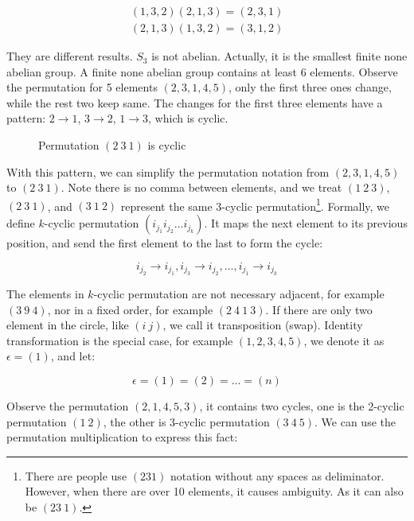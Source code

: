 \documentclass{article}
\begin{document}
\[
\begin{array}{l}
(1, 3, 2) (2, 1, 3) = (2, 3, 1) \\
(2, 1, 3) (1, 3, 2) = (3, 1, 2)
\end{array}
\]

They are different results. $S_3$ is not abelian. Actually, it is the smallest finite none abelian group. A finite none abelian group contains at least 6 elements. Observe the permutation for 5 elements $(2, 3, 1, 4, 5)$, only the first three ones change, while the rest two keep same. The changes for the first three elements have a pattern: $2 \to 1$, $3 \to 2$, $1 \to 3$, which is cyclic.

\begin{figure}[htbp]
\centering
{}
\caption{Permutation $(2\ 3\ 1)$ is cyclic}
\label{fig:cycle-permutation}
\end{figure}

With this pattern, we can simplify the permutation notation from $(2, 3, 1, 4, 5)$ to $(2\ 3\ 1)$. Note there is no comma between elements, and we treat $(1\ 2\ 3)$, $(2\ 3\ 1)$, and $(3\ 1\ 2)$ represent the same 3-cyclic permutation\footnote{There are people use $(231)$ notation without any spaces as deliminator. However, when there are over 10 elements, it causes ambiguity. As it can also be $(23\ 1)$.}. Formally, we define $k$-cyclic permutation $(i_{j_1} i_{j_2} ... i_{j_k})$. It maps the next element to its previous position, and send the first element to the last to form the cycle:

\[
i_{j_2} \to i_{j_1}, i_{j_3} \to i_{j_2}, ..., i_{j_1} \to i_{j_k}
\]

The elements in $k$-cyclic permutation are not necessary adjacent, for example $(3\ 9\ 4)$, nor in a fixed order, for example $(2\ 4\ 1\ 3)$. If there are only two element in the circle, like $(i\ j)$, we call it transposition (swap). Identity transformation is the special case, for example $(1, 2, 3, 4, 5)$, we denote it as $\epsilon = (1)$, and let:

\[
\epsilon = (1) = (2) = ... = (n)
\]

Observe the permutation $(2, 1, 4, 5, 3)$, it contains two cycles, one is the 2-cyclic permutation $(1\ 2)$, the other is 3-cyclic permutation $(3\ 4\ 5)$. We can use the permutation multiplication to express this fact:
\end{document}
